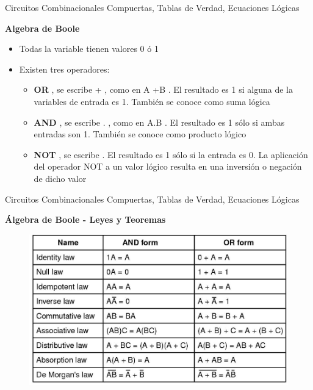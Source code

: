 \documentclass[aspectratio=169,compress]{beamer}
\begin{document}
\begin{footnotesize}
\begin{frame} {Circuitos Combinacionales} {Compuertas, Tablas de Verdad, Ecuaciones Lógicas}
\begin{center}\textbf{Algebra de Boole}\end{center}
\begin{itemize}
\item Todas la variable tienen valores 0 ó 1
\item Existen tres operadores:
\begin{itemize}
\item \textbf{OR}
, se escribe 
+
, como en 
A +B
. El resultado es 1 si alguna 
de la variables de entrada es 1. También se conoce como 
suma lógica
\item \textbf{AND}
, se escribe
 .
, como en
 A.B
. El resultado es 1 sólo si 
ambas entradas son 1. También se conoce como 
producto 
lógico
\item \textbf{NOT}
, se escribe      . El resultado es 1 sólo si la entrada es 0. 
La aplicación del operador NOT a un valor lógico resulta en 
una inversión o negación de dicho valor 
\end{itemize}
\end{itemize}
\end{frame}






\begin{frame} {Circuitos Combinacionales} {Compuertas, Tablas de Verdad, Ecuaciones Lógicas}
\begin{center}\textbf{Álgebra de Boole - Leyes y Teoremas}\end{center}
\begin{figure}
\includegraphics[scale=0.2]{images/leyes.jpg} 
\end{figure}
\end{frame}








\end{footnotesize}
\end{document}
